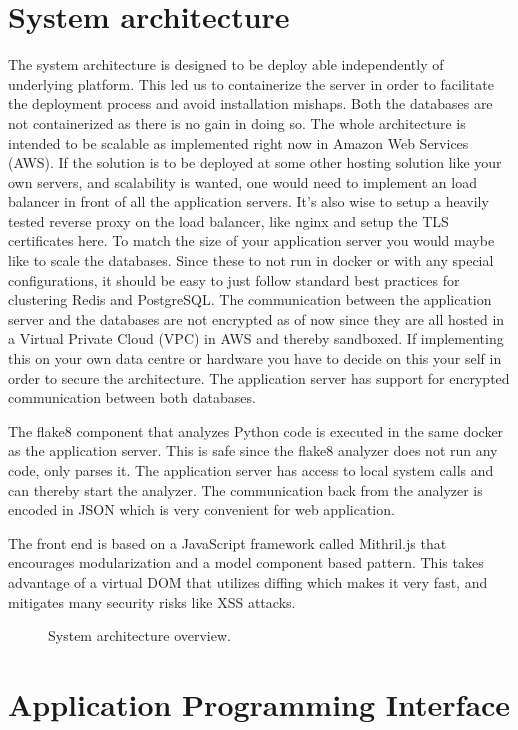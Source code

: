 \documentclass[12pt,a4paper]{report}
\begin{document}
\chapter{System architecture}
The system architecture is designed to be deploy able independently of underlying platform. This led us to containerize the server in order to facilitate the deployment process and avoid installation mishaps. Both the databases are not containerized as there is no gain in doing so.
The whole architecture is intended to be scalable as implemented right now in Amazon Web Services (AWS). If the solution is to be deployed at some other hosting solution like your own servers, and scalability is wanted, one would need to implement an load balancer in front of all the application servers. It's also wise to setup a heavily tested reverse proxy on the load balancer, like nginx and setup the TLS certificates here. To match the size of your application server you would maybe like to scale the databases. Since these to not run in docker or with any special configurations, it should be easy to just follow standard best practices for clustering Redis and PostgreSQL.
The communication between the application server and the databases are not encrypted as of now since they are all hosted in a Virtual Private Cloud (VPC) in AWS and thereby sandboxed. If implementing this on your own data centre or hardware you have to decide on this your self in order to secure the architecture. The application server has support for encrypted communication between both databases. 

The flake8 component that analyzes Python code is executed in the same docker as the application server. This is safe since the flake8 analyzer does not run any code, only parses it.
The application server has access to local system calls and can thereby start the analyzer. The communication back from the analyzer is encoded in JSON which is very convenient for web application.

The front end is based on a JavaScript framework called Mithril.js that encourages modularization and a model component based pattern. This takes advantage of a virtual DOM that utilizes diffing which makes it very fast, and mitigates many security risks like XSS attacks. 

\begin{figure}[H]
  \centering
  
  \caption{System architecture overview.}
\end{figure}
\chapter{Application Programming Interface}
\end{document}
